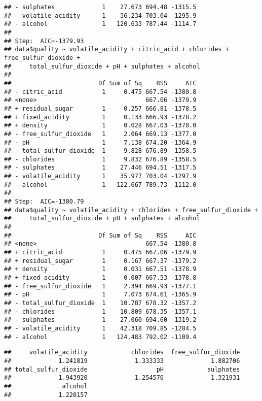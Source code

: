 \documentclass{article}
\begin{document}
\begin{verbatim}
## - sulphates             1    27.673 694.48 -1315.5
## - volatile_acidity      1    36.234 703.04 -1295.9
## - alcohol               1   120.633 787.44 -1114.7
## 
## Step:  AIC=-1379.93
## data$quality ~ volatile_acidity + citric_acid + chlorides + free_sulfur_dioxide + 
##     total_sulfur_dioxide + pH + sulphates + alcohol
## 
##                        Df Sum of Sq    RSS     AIC
## - citric_acid           1     0.475 667.54 -1380.8
## <none>                              667.06 -1379.9
## + residual_sugar        1     0.257 666.81 -1378.5
## + fixed_acidity         1     0.133 666.93 -1378.2
## + density               1     0.028 667.03 -1378.0
## - free_sulfur_dioxide   1     2.064 669.13 -1377.0
## - pH                    1     7.138 674.20 -1364.9
## - total_sulfur_dioxide  1     9.828 676.89 -1358.5
## - chlorides             1     9.832 676.89 -1358.5
## - sulphates             1    27.446 694.51 -1317.5
## - volatile_acidity      1    35.977 703.04 -1297.9
## - alcohol               1   122.667 789.73 -1112.0
## 
## Step:  AIC=-1380.79
## data$quality ~ volatile_acidity + chlorides + free_sulfur_dioxide + 
##     total_sulfur_dioxide + pH + sulphates + alcohol
## 
##                        Df Sum of Sq    RSS     AIC
## <none>                              667.54 -1380.8
## + citric_acid           1     0.475 667.06 -1379.9
## + residual_sugar        1     0.167 667.37 -1379.2
## + density               1     0.031 667.51 -1378.9
## + fixed_acidity         1     0.007 667.53 -1378.8
## - free_sulfur_dioxide   1     2.394 669.93 -1377.1
## - pH                    1     7.073 674.61 -1365.9
## - total_sulfur_dioxide  1    10.787 678.32 -1357.2
## - chlorides             1    10.809 678.35 -1357.1
## - sulphates             1    27.060 694.60 -1319.2
## - volatile_acidity      1    42.318 709.85 -1284.5
## - alcohol               1   124.483 792.02 -1109.4
\end{verbatim}

\begin{Shaded}
\begin{Highlighting}[]
\OtherTok{\textless{}{-}}\SpecialCharTok{::}
\end{Highlighting}
\end{Shaded}

\begin{verbatim}
##     volatile_acidity            chlorides  free_sulfur_dioxide 
##             1.241819             1.333333             1.882706 
## total_sulfur_dioxide                   pH            sulphates 
##             1.943920             1.254570             1.321931 
##              alcohol 
##             1.220157
\end{verbatim}
\end{document}
